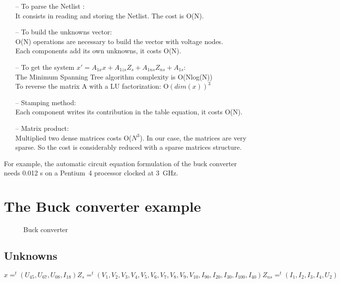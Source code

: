 \begin{itemize}

\item[--]To parse the Netlist : \\It consists in reading and storing the Netlist. The cost is O(N).
\item[--] To build the unknowns vector:\\
O(N) operations are necessary to build the vector with voltage nodes.\\
Each components add its own unknowns, it costs O(N).
\item[--] To get the system $x' = A_{1x}x +A_{1zs}Z_{s} + A_{1ns}Z_{ns}+A_{1s}$:\\
The Minimum Spanning Tree algorithm complexity is O(Nlog(N))\\
To reverse the matrix A with a LU factorization: O$(dim(x))^{3}$
\item[--] Stamping method:\\
Each component writes its contribution in the table equation, it costs O(N).
\item[--] Matrix product:\\
Multiplied two dense matrices costs O($N^{3}$). In our case, the matrices are very sparse. So
the cost is considerably reduced with a sparse matrices structure.

\end{itemize}
For example, the automatic circuit equation formulation of the buck converter needs 0.012 s on a Pentium~4 processor clocked at 3~GHz.





\section{The Buck converter example}
\begin{figure}[h]
\centerline{
 \scalebox{1.0}{
    
 }
}
\caption{Buck converter}
\label{fig-Buck-converter}
\end{figure}
\subsection{Unknowns}
$x=^{t}(U_{45},U_{67},U_{08},I_{18}) Z_{s}=^{t}(V_{1},V_{2},V_{3},V_{4},V_{5},V_{6},V_{7},V_{8},V_{9},V_{10},I_{90},I_{20},I_{30},I_{100},I_{40})
Z_{ns}=^{t}(I_{1},I_{2},I_{3},I_{4},U_{2})$\\
